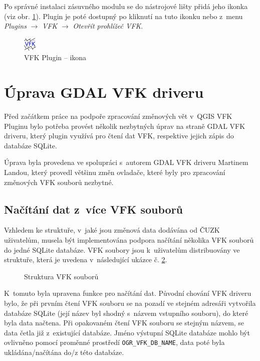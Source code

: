 \documentclass[a4paper,12pt,oneside]{book}
\begin{document}
Po správné instalaci zásuvného modulu se do nástrojové lišty přidá jeho ikonka (viz obr. \ref{l_plugin_ikona}). Plugin je poté dostupný po kliknutí na tuto ikonku nebo z~menu \textit{Plugins} $\rightarrow$ \textit{VFK} $\rightarrow$ \textit{Otevřít prohlížeč VFK}.

\begin{figure}[H]
\centering
\includegraphics[scale=0.9]{images/vfkPluginIcon.png}
\caption[VFK Plugin -- ikona]{VFK Plugin -- ikona}
\label{l_plugin_ikona}
\end{figure}

\clearpage
\section{Úprava GDAL VFK driveru}
\label{l_uprava_gdal}
Před začátkem práce na podpoře zpracování změnových vět v~QGIS VFK Pluginu bylo potřeba provést několik nezbytných úprav na straně GDAL VFK driveru, který plugin využívá pro čtení dat VFK, respektive jejich zápis do databáze SQLite.

Úprava byla provedena ve spolupráci s~autorem GDAL VFK driveru Martinem Landou, který provedl většinu změn ovladače, které byly pro zpracování změnových VFK souborů nezbytné. 

\subsection{Načítání dat z~více VFK souborů}
Vzhledem ke struktuře, v~jaké jsou změnová data dodávána od ČUZK uživatelům, musela být implementována podpora načítání několika VFK souborů do jedné SQLite databáze. VFK soubory jsou k~uživatelům distribuovány ve struktuře, která je uvedena v~následující ukázce č. \ref{l_struktura_sireni_vfk}.

\begin{figure}[htb]
\centering
\begin{minipage}{0.9\textwidth}
\end{minipage}
\caption{Struktura VFK souborů}
\label{l_struktura_sireni_vfk}
\end{figure}

K~tomuto byla upravena funkce pro načítání dat. Původní chování VFK driveru bylo, že při prvním čtení VFK souboru se na pozadí ve stejném adresáři vytvořila databáze SQLite (její název byl shodný s~názvem vstupního souboru), do které byla data načtena. Při opakovaném čtení VFK souboru se stejným názvem, se data četla již z~existující databáze. Jméno výstupní SQLite databáze mohlo být ovlivněno pomocí proměnné prostředí \texttt{OGR\_VFK\_DB\_NAME}, data poté byla ukládána/načítána do/z této databáze. 
\end{document}
